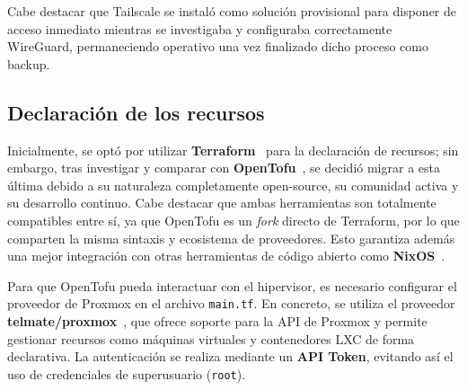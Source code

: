 \documentclass[a4paper, 11pt]{article}
\begin{document}
Cabe destacar que Tailscale se instaló como solución provisional para disponer de acceso 
inmediato mientras se investigaba y configuraba correctamente WireGuard, permaneciendo 
operativo una vez finalizado dicho proceso como backup. 

\subsection{Declaración de los recursos}

Inicialmente, se optó por utilizar \textbf{Terraform}~\cite{terraform} para la declaración 
de recursos; sin embargo, tras investigar y comparar con \textbf{OpenTofu}~\cite{opentofu}, 
se decidió migrar a esta última debido a su naturaleza completamente open-source, su comunidad 
activa y su desarrollo continuo. Cabe destacar que ambas herramientas son totalmente compatibles 
entre sí, ya que OpenTofu es un \textit{fork} directo de Terraform, por lo que comparten la 
misma sintaxis y ecosistema de proveedores. Esto garantiza además una mejor integración con 
otras herramientas de código abierto como \textbf{NixOS}~\cite{nixos}.

Para que OpenTofu pueda interactuar con el hipervisor, es necesario configurar el proveedor 
de Proxmox en el archivo \texttt{main.tf}. En concreto, se utiliza el proveedor 
\textbf{telmate/proxmox}~\cite{telmate}, que ofrece soporte para la API de Proxmox y permite 
gestionar recursos como máquinas virtuales y contenedores LXC de forma declarativa. 
La autenticación se realiza mediante un \textbf{API Token}, evitando así el uso de 
credenciales de superusuario (\texttt{root}).
\end{document}
